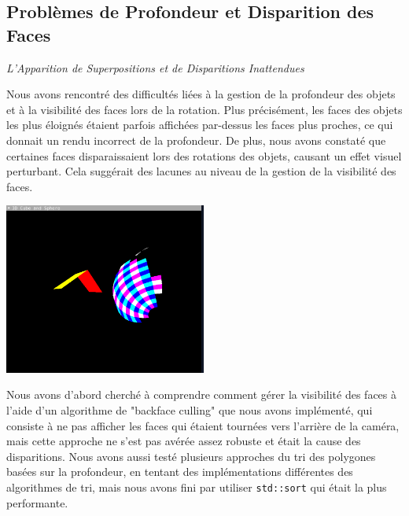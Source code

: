 \documentclass[12pt]{article}
\begin{document}
\subsection{Problèmes de Profondeur et Disparition des Faces}
\label{subsec:gestion_profondeur}

\textit{L'Apparition de Superpositions et de Disparitions Inattendues}

\noindent Nous avons rencontré des difficultés liées à la gestion de la profondeur des objets et à la visibilité des faces lors de la rotation. Plus précisément, les faces des objets les plus éloignés étaient parfois affichées par-dessus les faces plus proches, ce qui donnait un rendu incorrect de la profondeur. De plus, nous avons constaté que certaines faces disparaissaient lors des rotations des objets, causant un effet visuel perturbant. Cela suggérait des lacunes au niveau de la gestion de la visibilité des faces.

\begin{center}
\includegraphics[width=0.5\textwidth]{2.png}
\end{center}

\noindent Nous avons d'abord cherché à comprendre comment gérer la visibilité des faces à l'aide d'un algorithme de "backface culling" que nous avons implémenté, qui consiste à ne pas afficher les faces qui étaient tournées vers l'arrière de la caméra, mais cette approche ne s'est pas avérée assez robuste et était la cause des disparitions. Nous avons aussi testé plusieurs approches du tri des polygones basées sur la profondeur, en tentant des implémentations différentes des algorithmes de tri, mais nous avons fini par utiliser \texttt{std::sort} qui était la plus performante.
\end{document}
